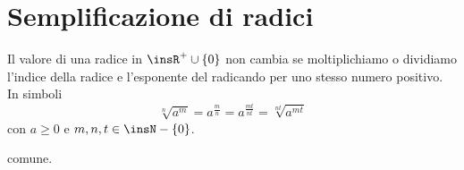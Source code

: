 
\section{Semplificazione di radici}
\label{sec:radici_semplificazione}

\begin{proposizione}
Il valore di una radice in $\insR^+\cup \{0\}$ non cambia se moltiplichiamo 
o dividiamo l'indice della radice e l'esponente del radicando per uno stesso 
numero positivo. 
In simboli 
\[\sqrt[n]{a^m}=a^{\frac{m}{n}}=a^{\frac{mt}{nt}}=\sqrt[nt]{a^{mt}}\]
con $a\ge 0$ e $m,n,t\in \insN-\{0\}$.
\end{proposizione}

% 
comune. 


